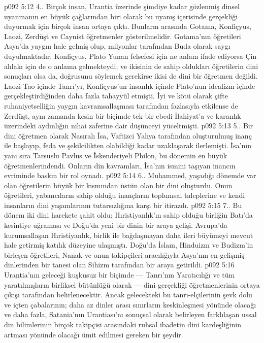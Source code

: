 \vs p092 5:12 4.\bibnobreakspace {}. Birçok insan, Urantia üzerinde şimdiye kadar gözlenmiş dinsel uyanmanın en büyük çağlarından biri olarak bu uyanış içerisinde gerçekliği duyurmak için birçok insan ortaya çıktı. Bunların arasında Gotama, Konfiçyus, Laozi, Zerdüşt ve Caynist öğretmenler gösterilmelidir. Gotama’nın öğretileri Asya’da yaygın hale gelmiş olup, milyonlar tarafından Buda olarak saygı duyulmaktadır. Konfiçyus, Plato Yunan felsefesi için ne anlam ifade ediyorsa Çin ahlakı için de o anlama gelmekteydi; ve ikisinin de sahip oldukları öğretilerin dini sonuçları olsa da, doğrusunu söylemek gerekirse ikisi de dini bir öğretmen değildi. Laozi Tao içinde Tanrı’yı, Konfiçyus’un insanlık içinde Plato’nun idealizm içinde gerçekleştirdiğinden daha fazla tahayyül etmişti. İyi ve kötü olarak çifte ruhaniyetselliğin yaygın kavramsallaşması tarafından fazlasıyla etkilense de Zerdüşt, aynı zamanda kesin bir biçimde tek bir ebedi İlahiyat’a ve karanlık üzerindeki aydınlığın nihai zaferine dair düşünceyi yüceltmişti.
\vs p092 5:13 5.\bibnobreakspace {}. Bir dini öğretmen olarak Nasıralı İsa, Vaftizci Yahya tarafından oluşturulmuş inanç ile başlayıp, feda ve şekilcilikten olabildiği kadar uzaklaşarak ilerlemişti. İsa’nın yanı sıra Tarsuslu Pavlus ve İskenderiyeli Philon, bu dönemin en büyük öğretmenlerindendi. Onların din kavramları, İsa’nın ismini taşıyan inancın evriminde baskın bir rol oynadı.
\vs p092 5:14 6.. Muhammed, yaşadığı dönemde var olan öğretilerin büyük bir kısmından üstün olan bir dini oluşturdu. Onun öğretileri, yabancıların sahip olduğu inançların toplumsal taleplerine ve kendi insanların dini yaşamlarının tutarsızlığına karşı bir itirazdı.
\vs p092 5:15 7.\bibnobreakspace {}. Bu dönem iki dini harekete şahit oldu: Hıristiyanlık’ın sahip olduğu birliğin Batı’da kesintiye uğraması ve Doğu’da yeni bir dinin bir araya gelişi. Avrupa’da kurumsallaşan Hıristiyanlık, birlik ile bağdaşmayan daha ileri büyümeyi mevcut hale getirmiş katılık düzeyine ulaşmıştı. Doğu’da İslam, Hinduizm ve Budizm’in birleşen öğretileri, Nanak ve onun takipçileri aracılığıyla Asya’nın en gelişmiş dinlerinden bir tanesi olan Sihizm tarafından bir araya getirildi.
\vs p092 5:16 Urantia’nın geleceği kuşkusuz bir biçimde --- Tanrı’nın Yaratıcılığı ve tüm yaratılmışların birliksel bütünlüğü olarak --- dini gerçekliği öğretmenlerinin ortaya çıkışı tarafından belirlenecektir. Ancak gelecekteki bu tanrı\hyp{}elçilerinin şevk dolu ve içten çabalarının; daha az dinler arası sınırların keskinleşmesi yönünde olacağı ve daha fazla, Satania’nın Urantiası’nı sonuçsal olarak belirleyen farklılaşan ussal din bilimlerinin birçok takipçisi arasındaki ruhsal ibadetin dini kardeşliğinin artması yönünde olacağı ümit edilmesi gereken bir şeydir.
